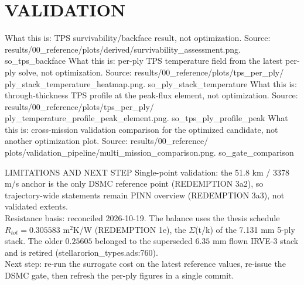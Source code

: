 \documentclass[aspectratio=169,11pt]{beamer}
\begin{document}
\section{VALIDATION}
  {%
   What this is: TPS survivability/backface result, not optimization.
   Source: results/00\_reference/plots/derived/survivability\_assessment.png.}
  {so_tps_backface}
  {%
   What this is: per-ply TPS temperature field from the latest per-ply solve,
   not optimization. Source: results/00\_reference/plots/tps\_per\_ply/
   ply\_stack\_temperature\_heatmap.png.}
  {so_ply_stack_temperature}
  {%
   What this is: through-thickness TPS profile at the peak-flux element, not
   optimization. Source: results/00\_reference/plots/tps\_per\_ply/
   ply\_temperature\_profile\_peak\_element.png.}
  {so_tps_ply_profile_peak}
  {%
   What this is: cross-mission validation comparison for the optimized
   candidate, not another optimization plot. Source: results/00\_reference/
   plots/validation\_pipeline/multi\_mission\_comparison.png.}
  {so_gate_comparison}
\begin{frame}{LIMITATIONS AND NEXT STEP}
  \footnotesize
  Single-point validation: the 51.8 km / 3378 m/s anchor is the only DSMC
  reference point (REDEMPTION 3a2), so trajectory-wide statements remain PINN
  overview (REDEMPTION 3a3), not validated extents.\\
  Resistance basis: reconciled 2026-10-19. The balance uses the thesis
  schedule $R_{tot}=0.305583$ m$^2$K/W (REDEMPTION 1e), the $\Sigma$(t/k) of
  the 7.131 mm 5-ply stack. The older $0.25605$ belonged to the superseded
  $6.35$ mm flown IRVE-3 stack and is retired (stellarorion\_types.ads:760).\\
  Next step: re-run the surrogate cost on the latest reference values, re-issue
  the DSMC gate, then refresh the per-ply figures in a single commit.
\end{frame}
\end{document}
